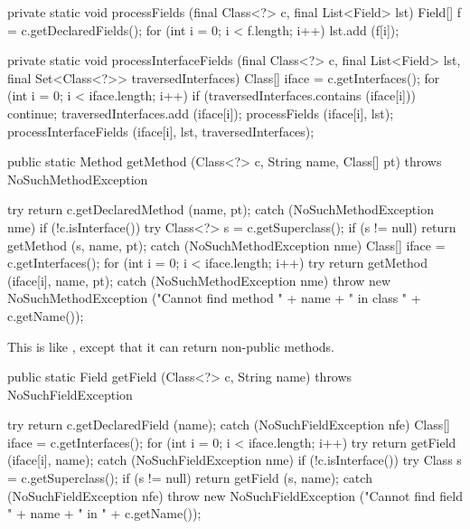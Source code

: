 \begin{code}\begin{hide}

   private static void processFields (final Class<?> c, final List<Field> lst) {
      Field[] f = c.getDeclaredFields();
      for (int i = 0; i < f.length; i++)
         lst.add (f[i]);
   }

   private static void processInterfaceFields (final Class<?> c, final List<Field> lst, final Set<Class<?>> traversedInterfaces) {
      Class[] iface = c.getInterfaces();
      for (int i = 0; i < iface.length; i++) {
         if (traversedInterfaces.contains (iface[i]))
            continue;
         traversedInterfaces.add (iface[i]);
         processFields (iface[i], lst);
         processInterfaceFields (iface[i], lst, traversedInterfaces);
      }
   }\end{hide}

   public static Method getMethod (Class<?> c, String name, Class[] pt)
                                   throws NoSuchMethodException \begin{hide} {
      try {
         return c.getDeclaredMethod (name, pt);
      }
      catch (NoSuchMethodException nme) {}
      if (!c.isInterface())
         try {
            Class<?> s = c.getSuperclass();
            if (s != null)
               return getMethod (s, name, pt);
         }
         catch (NoSuchMethodException nme) {}
      Class[] iface = c.getInterfaces();
      for (int i = 0; i < iface.length; i++)
         try {
            return getMethod (iface[i], name, pt);
         }
         catch (NoSuchMethodException nme) {}
      throw new NoSuchMethodException
         ("Cannot find method " + name + " in class " + c.getName());
   }\end{hide}
\end{code}
\begin{tabb}   This is like , except that it can return non-public methods.
\end{tabb}
\begin{htmlonly}
\end{htmlonly}
\begin{code}

   public static Field getField (Class<?> c, String name)
                                 throws NoSuchFieldException\begin{hide} {
      try {
         return c.getDeclaredField (name);
      }
      catch (NoSuchFieldException nfe) {}
      Class[] iface = c.getInterfaces();
      for (int i = 0; i < iface.length; i++)
         try {
            return getField (iface[i], name);
         }
         catch (NoSuchFieldException nme) {}
      if (!c.isInterface())
         try {
            Class s = c.getSuperclass();
            if (s != null)
               return getField (s, name);
         }
         catch (NoSuchFieldException nfe) {}
      throw new NoSuchFieldException
         ("Cannot find field " + name + " in " + c.getName());
   }\end{hide}
\end{code}
